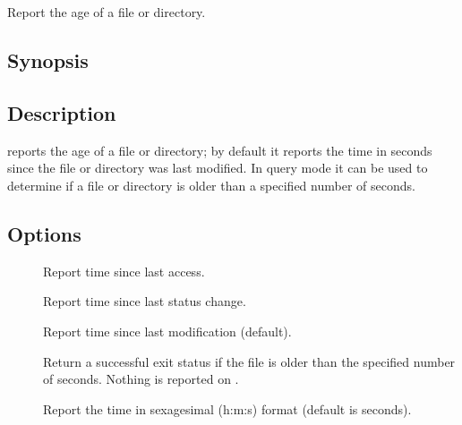 
\newpage
\section{}
\label{tract}

Report the age of a file or directory.

\subsection*{Synopsis}

\begin{synopsis}
\end{synopsis}

\subsection*{Description}

 reports the age of a file or directory; by default it reports the
time in seconds since the file or directory was last modified.  In query mode
it can be used to determine if a file or directory is older than a specified
number of seconds.

\subsection*{Options}

\begin{description}
\item[]
   Report time since last access.

\item[]
   Report time since last status change.

\item[]
   Report time since last modification (default).

\item[]
   Return a successful exit status if the file is older than the specified
   number of seconds.  Nothing is reported on .

\item[]
   Report the time in sexagesimal (h:m:s) format (default is seconds).
\end{description}

